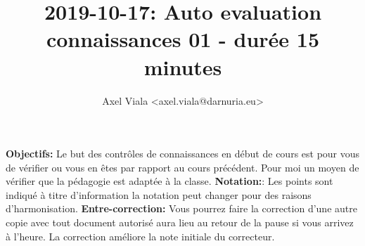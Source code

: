 \documentclass[11pt,a4paper,addpoint]{exam}
\author{Axel Viala <axel.viala@darnuria.eu>}
\title{2019-10-17: Auto evaluation connaissances 01 - durée 15 minutes}
\begin{document}
  \maketitle
  \textbf{Objectifs:} Le but des contrôles de connaissances en début de cours est pour vous de vérifier ou vous
  en êtes par rapport au cours précédent.
  \newline
  Pour moi un moyen de vérifier que la pédagogie est adaptée à la classe.
  \newline
  \textbf{Notation:}: Les points sont indiqué à titre d'information la notation peut changer pour
  des raisons d'harmonisation.
  \newline
  \textbf{Entre-correction:} Vous pourrez faire la correction d'une autre copie avec tout document
  autorisé aura lieu au retour de la pause si vous arrivez à l'heure. La correction
  améliore la note initiale du correcteur.
\end{document}
